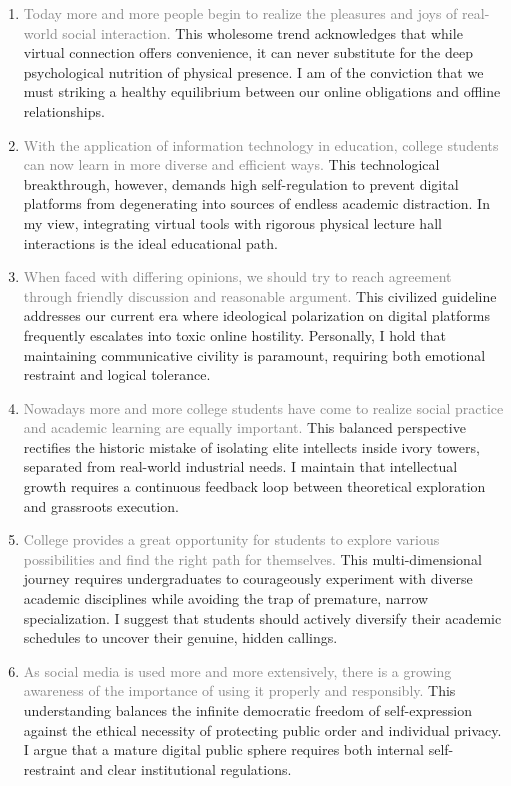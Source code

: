 ﻿\documentclass[lang=cn,11pt]{elegantbook}
\begin{document}
\begin{enumerate}
    \item \textcolor{gray}{Today more and more people begin to realize the pleasures and joys of real-world social interaction.} This wholesome trend acknowledges that while virtual connection offers convenience, it can never substitute for the deep psychological nutrition of physical presence. I am of the conviction that we must striking a healthy equilibrium between our online obligations and offline relationships.
    \item \textcolor{gray}{With the application of information technology in education, college students can now learn in more diverse and efficient ways.} This technological breakthrough, however, demands high self-regulation to prevent digital platforms from degenerating into sources of endless academic distraction. In my view, integrating virtual tools with rigorous physical lecture hall interactions is the ideal educational path.
    \item \textcolor{gray}{When faced with differing opinions, we should try to reach agreement through friendly discussion and reasonable argument.} This civilized guideline addresses our current era where ideological polarization on digital platforms frequently escalates into toxic online hostility. Personally, I hold that maintaining communicative civility is paramount, requiring both emotional restraint and logical tolerance.
    \item \textcolor{gray}{Nowadays more and more college students have come to realize social practice and academic learning are equally important.} This balanced perspective rectifies the historic mistake of isolating elite intellects inside ivory towers, separated from real-world industrial needs. I maintain that intellectual growth requires a continuous feedback loop between theoretical exploration and grassroots execution.
    \item \textcolor{gray}{College provides a great opportunity for students to explore various possibilities and find the right path for themselves.} This multi-dimensional journey requires undergraduates to courageously experiment with diverse academic disciplines while avoiding the trap of premature, narrow specialization. I suggest that students should actively diversify their academic schedules to uncover their genuine, hidden callings.
    \item \textcolor{gray}{As social media is used more and more extensively, there is a growing awareness of the importance of using it properly and responsibly.} This understanding balances the infinite democratic freedom of self-expression against the ethical necessity of protecting public order and individual privacy. I argue that a mature digital public sphere requires both internal self-restraint and clear institutional regulations.

\end{enumerate}
\end{document}
